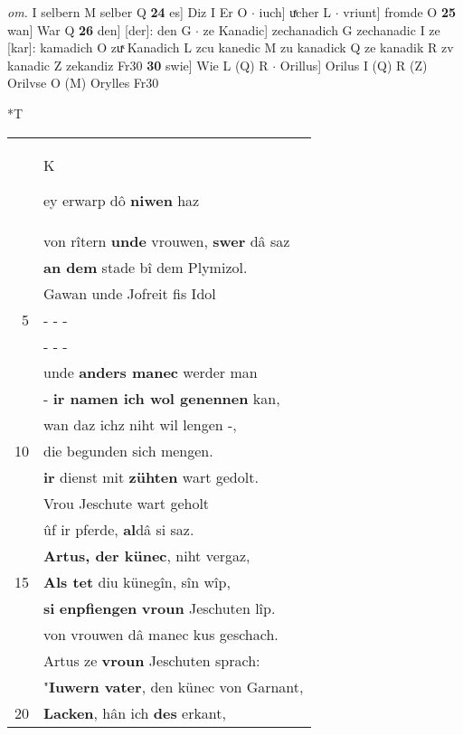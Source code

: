 \documentclass[8pt,a4paper,notitlepage]{article}
\begin{document}
\begin{table}[ht]
\begin{minipage}[t]{0.5\linewidth}
\textit{om.} I selbern M selber Q \textbf{24} es] Diz I Er O  $\cdot$ iuch] uͯcher L  $\cdot$ vriunt] fromde O \textbf{25} wan] War Q \textbf{26} den] [der]: den G  $\cdot$ ze Kanadic] zechanadich G zechanadic I ze [kar]: kamadich O zuͯ Kanadich L zcu kanedic M zu kanadick Q ze kanadik R zv kanadic Z zekandiz Fr30 \textbf{30} swie] Wie L (Q) R  $\cdot$ Orillus] Orilus I (Q) R (Z) Orilvse O (M) Orylles Fr30 \newline
\end{minipage}
\hspace{0.5cm}
\begin{minipage}[t]{0.5\linewidth}
\small
\begin{center}*T
\end{center}
\begin{tabular}{rl}
 & \begin{large}K\end{large}ey erwarp dô \textbf{niwen} haz\\ 
 & von rîtern \textbf{unde} vrouwen, \textbf{swer} dâ saz\\ 
 & \textbf{an dem} stade bî dem Plymizol.\\ 
 & Gawan unde Jofreit fis Idol\\ 
5 & \multicolumn{1}{l}{ - - - }\\ 
 & \multicolumn{1}{l}{ - - - }\\ 
 & unde \textbf{anders manec} werder man\\ 
 & - \textbf{ir namen ich wol genennen} kan,\\ 
 & wan daz ichz niht wil lengen -,\\ 
10 & die begunden sich mengen.\\ 
 & \textbf{ir} dienst mit \textbf{zühten} wart gedolt.\\ 
 & Vrou Jeschute wart geholt\\ 
 & ûf ir pferde, \textbf{al}dâ si saz.\\ 
 & \textbf{Artus, der künec}, niht vergaz,\\ 
15 & \textbf{Als tet} diu künegîn, sîn wîp,\\ 
 & \textbf{si} \textbf{enpfiengen} \textbf{vroun} Jeschuten lîp.\\ 
 & von vrouwen dâ manec kus geschach.\\ 
 & Artus ze \textbf{vroun} Jeschuten sprach:\\ 
 & "\textbf{Iuwern vater}, den künec von Garnant,\\ 
20 & \textbf{Lacken}, hân ich \textbf{des} erkant,\\ 

\end{tabular}
\end{minipage}
\end{table}
\end{document}
